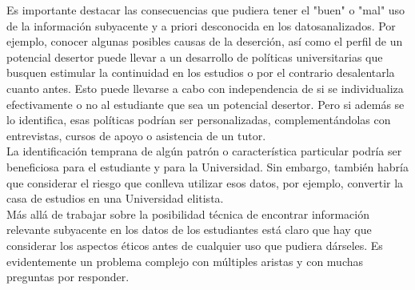 


Es importante destacar las consecuencias que pudiera tener el "buen" o "mal" uso de la información subyacente y a priori desconocida en los datosanalizados. Por ejemplo, conocer algunas posibles causas de la deserción, así como el perfil de un potencial desertor puede llevar a un desarrollo de políticas universitarias
que busquen estimular la continuidad en los estudios o por el contrario desalentarla
cuanto antes. Esto puede llevarse a cabo con independencia de si se individualiza
efectivamente o no al estudiante que sea un potencial desertor. Pero si además se lo
identifica, esas políticas podrían ser personalizadas, complementándolas con
entrevistas, cursos de apoyo o asistencia de un tutor. \\
La identificación temprana de algún patrón o característica particular podría ser beneficiosa para el estudiante y para la Universidad. Sin embargo, también habría que considerar el riesgo que conlleva utilizar esos datos, por ejemplo, convertir la casa de estudios en una Universidad elitista.\\
Más allá de trabajar sobre la posibilidad técnica de encontrar información relevante
subyacente en los datos de los estudiantes está claro que hay que considerar los
aspectos éticos antes de cualquier uso que pudiera dárseles. Es evidentemente un
problema complejo con múltiples aristas y con muchas preguntas por responder.

